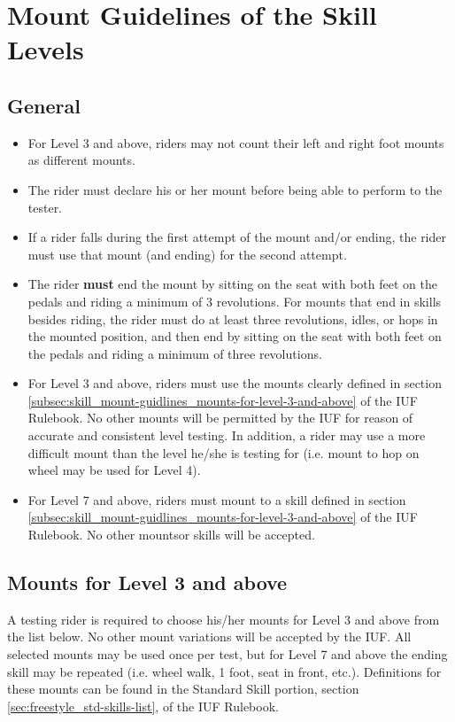 \section{Mount Guidelines of the Skill Levels}

\subsection{General}
\begin{itemize}
\item For Level 3 and above, riders may not count their left and right foot mounts as different mounts.
\item The rider must declare his or her mount before being able to perform to the tester.
\item If a rider falls during the first attempt of the mount and/or ending, the rider must use that mount (and ending) for the second attempt.
\item The rider \textbf{must} end the mount by sitting on the seat with both feet on the pedals and riding a minimum of 3 revolutions.
For mounts that end in skills besides riding, the rider must do at least three revolutions, idles, or hops in the mounted position, and then end by sitting on the seat with both feet on the pedals and riding a minimum of three revolutions.
\item For Level 3 and above, riders must use the mounts clearly defined in section \ref{subsec:skill_mount-guidlines_mounts-for-level-3-and-above} of the IUF Rulebook.
No other mounts will be permitted by the IUF for reason of accurate and consistent level testing.
In addition, a rider may use a more difficult mount than the level he/she is testing for (i.e.
mount to hop on wheel may be used for Level 4).
\item For Level 7 and above, riders must mount to a skill defined in section \ref{subsec:skill_mount-guidlines_mounts-for-level-3-and-above} of the IUF Rulebook.
No other mountsor skills will be accepted.
\end{itemize}


\subsection{Mounts for Level 3 and above \label{subsec:skill_mount-guidlines_mounts-for-level-3-and-above}}
A testing rider is required to choose his/her mounts for Level 3 and above from the list below.
No other mount variations will be accepted by the IUF.
All selected mounts may be used once per test, but for Level 7 and above the ending skill may be repeated (i.e. wheel walk, 1 foot, seat in front, etc.).
Definitions for these mounts can be found in the Standard Skill portion, section \ref{sec:freestyle_std-skills-list}, of the IUF Rulebook.

